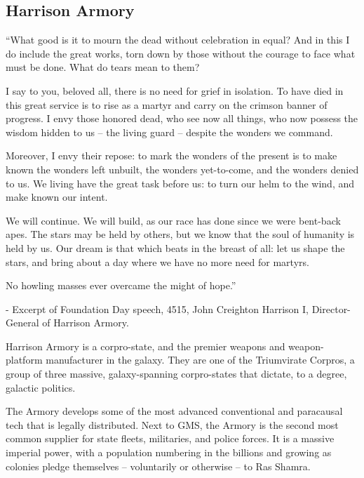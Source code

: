 \subsection{Harrison Armory}
\begin{loreQuote}
         ``What good is it to mourn the dead without celebration in equal? And in this I do include the
         great works, torn down by those without the courage to face what must be done. What do
         tears mean to them?

         I say to you, beloved all, there is no need for grief in isolation. To have died in this great
         service is to rise as a martyr and carry on the crimson banner of progress. I envy those
         honored dead, who see now all things, who now possess the wisdom hidden to us -- the
         living guard -- despite the wonders we command.

         Moreover, I envy their repose: to mark the wonders of the present is to make known the
         wonders left unbuilt, the wonders yet-to-come, and the wonders denied to us. We living
         have the great task before us: to turn our helm to the wind, and make known our intent.

         We will continue. We will build, as our race has done since we were bent-back apes. The
         stars may be held by others, but we know that the soul of humanity is held by us. Our
         dream is that which beats in the breast of all: let us shape the stars, and bring about a day
         where we have no more need for martyrs.

         No howling masses ever overcame the might of hope.''

         \qquad - \quad Excerpt of Foundation Day speech, 4515, John Creighton Harrison I,
         \qquad Director-General of Harrison Armory.
\end{loreQuote}

Harrison Armory is a corpro-state, and the premier weapons and weapon-platform manufacturer
in the galaxy. They are one of the Triumvirate Corpros, a group of three massive, galaxy-spanning
corpro-states that dictate, to a degree, galactic politics.

The Armory develops some of the most advanced conventional and paracausal tech that is legally
distributed. Next to GMS, the Armory is the second most common supplier for state fleets,
militaries, and police forces. It is a massive imperial power, with a population numbering in the
billions and growing as colonies pledge themselves -- voluntarily or otherwise -- to Ras Shamra.


